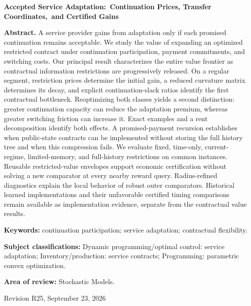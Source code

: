 \documentclass[11pt,letterpaper]{article}
\theoremstyle{definition}\newtheorem{assumption}[theorem]{Assumption}
\begin{document}
\begin{titlepage}\centering
{\Large\bfseries Accepted Service Adaptation:\ Continuation Prices, Transfer Coordinates,\ and Certified Gains\par}
\vspace{.35in}{Anonymous manuscript for Operations Research\par}\vspace{.25in}
\begin{minipage}{\textwidth}
\textbf{Abstract.}
A service provider gains from adaptation only if each promised continuation remains acceptable. We study the value of expanding an optimized restricted contract under continuation participation, payment commitments, and switching costs. Our principal result characterizes the entire value frontier as contractual information restrictions are progressively released. On a regular segment, restriction prices determine the initial gain, a reduced curvature matrix determines its decay, and explicit continuation-slack ratios identify the first contractual bottleneck. Reoptimizing both classes yields a second distinction: greater continuation capacity can reduce the adaptation premium, whereas greater switching friction can increase it. Exact examples and a rent decomposition identify both effects. A promised-payment recursion establishes when public-state contracts can be implemented without storing the full history tree and when this compression fails. We evaluate fixed, time-only, current-regime, limited-memory, and full-history restrictions on common instances. Reusable restricted-value envelopes support economic certification without solving a new comparator at every nearby reward query. Radius-refined diagnostics explain the local behavior of robust outer comparators. Historical learned implementations and their unfavorable certified timing comparisons remain available as implementation evidence, separate from the contractual value results.
\par\vspace{.15in}\textbf{Keywords:} continuation participation; service adaptation; contractual flexibility.
\par\vspace{.1in}\textbf{Subject classifications:} Dynamic programming/optimal control: service adaptation; Inventory/production: service contracts; Programming: parametric convex optimization.
\par\vspace{.1in}\textbf{Area of review:} Stochastic Models.
\end{minipage}\vfill{Revision R25, September 23, 2026\par}
\end{titlepage}
\end{document}
